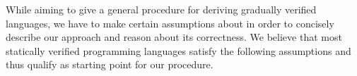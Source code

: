 \begin{comment}
    \begin{alignat*}{3}
    	 & \rlap{\textbf{Syntax}}                                              &  &                       & ~ \\
    	 & \grad{s}                                                            &  & \in \setGStmt         &  \\
    	 & \grad{\phi}                                                         &  & \in \setGFormula      &  \\
    	 &  \\
    	 & \rlap{\textbf{Program State}}                                       &  &                       &  \\
    	 & \grad{\pi}                                                          &  & \in \setGProgramState &  \\
    	 &  \\
    	 & \rlap{\textbf{Semantics}}                                           &  &                       &  \\
    	 & \rlap{Static  ~~~~$\gthoare{}{\grad{\phi}}{\grad{s}}{\grad{\phi}}$} &  &                       &  \\
    	 & \rlap{Dynamic ~$\gsstep{\grad{\pi}}{\grad{\pi}}$}                   &  &                       &  \\
    	 & \rlap{Formula ~~$\evalgphiGen{\grad{\pi}}{\grad{\phi}}$}            &  &                       &  \\
    	 & ~ \\
    	 & \rlap{\textbf{Soundness}}                                           &  &                       &
    \end{alignat*}
\end{comment}



While aiming to give a general procedure for deriving gradually verified languages, we have to make certain assumptions about \svl in order to concisely describe our approach and reason about its correctness.
We believe that most statically verified programming languages satisfy the following assumptions and thus qualify as starting point for our procedure.

